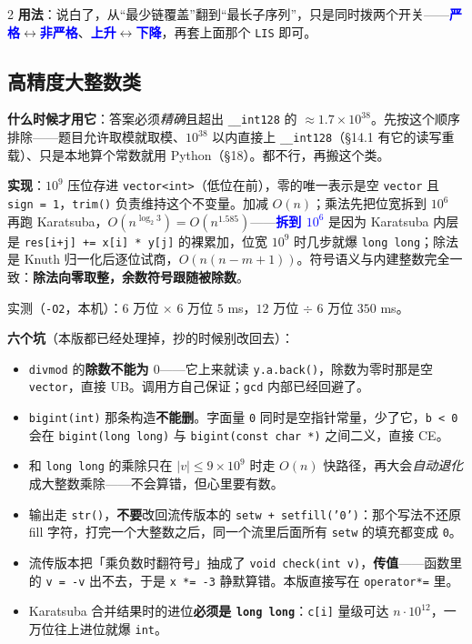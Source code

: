 \begin{multicols*}{2}
		\textbf{用法}：说白了，从``最少链覆盖''翻到``最长子序列''，只是同时拨两个开关——\textcolor{blue}{\textbf{严格}}$\leftrightarrow$\textcolor{blue}{\textbf{非严格}}、\textcolor{blue}{\textbf{上升}}$\leftrightarrow$\textcolor{blue}{\textbf{下降}}，再套上面那个 \texttt{LIS} 即可。


	\end{multicols*} %

		\subsection[\tochl{高精度大整数类}]{高精度大整数类}

		\textbf{什么时候才用它}：答案必须\emph{精确}且超出 \texttt{\_\_int128} 的 $\approx 1.7 \times 10^{38}$。先按这个顺序排除——题目允许取模就取模、$10^{38}$ 以内直接上 \texttt{\_\_int128}（§14.1 有它的读写重载）、只是本地算个常数就用 Python（§18）。都不行，再搬这个类。

		\textbf{实现}：$10^9$ 压位存进 \texttt{vector<int>}（低位在前），零的唯一表示是空 \texttt{vector} 且 \texttt{sign = 1}，\texttt{trim()} 负责维持这个不变量。加减 $O(n)$；乘法先把位宽拆到 $10^6$ 再跑 Karatsuba，$O(n^{\log_2 3}) = O(n^{1.585})$——\textcolor{blue}{\textbf{拆到 $10^6$}} 是因为 Karatsuba 内层是 \texttt{res[i+j] += x[i] * y[j]} 的裸累加，位宽 $10^9$ 时几步就爆 \texttt{long long}；除法是 Knuth 归一化后逐位试商，$O(n(n-m+1))$。符号语义与内建整数完全一致：\textbf{除法向零取整，余数符号跟随被除数}。

		实测（\texttt{-O2}，本机）：$6$ 万位 $\times$ $6$ 万位 $5$ ms，$12$ 万位 $\div$ $6$ 万位 $350$ ms。

		\textbf{六个坑}（本版都已经处理掉，抄的时候别改回去）：

		\begin{itemize}
			\item \texttt{divmod} 的\textbf{除数不能为 $0$}——它上来就读 \texttt{y.a.back()}，除数为零时那是空 \texttt{vector}，直接 UB。调用方自己保证；\texttt{gcd} 内部已经回避了。
			\item \texttt{bigint(int)} 那条构造\textbf{不能删}。字面量 \texttt{0} 同时是空指针常量，少了它，\texttt{b < 0} 会在 \texttt{bigint(long long)} 与 \texttt{bigint(const char *)} 之间二义，直接 CE。
			\item 和 \texttt{long long} 的乘除只在 $|v| \le 9 \times 10^9$ 时走 $O(n)$ 快路径，再大会\emph{自动退化}成大整数乘除——不会算错，但心里要有数。
			\item 输出走 \texttt{str()}，\textbf{不要}改回流传版本的 \texttt{setw + setfill('0')}：那个写法不还原 fill 字符，打完一个大整数之后，同一个流里后面所有 \texttt{setw} 的填充都变成 \texttt{0}。
			\item 流传版本把「乘负数时翻符号」抽成了 \texttt{void check(int v)}，\textbf{传值}——函数里的 \texttt{v = -v} 出不去，于是 \texttt{x *= -3} 静默算错。本版直接写在 \texttt{operator*=} 里。
			\item Karatsuba 合并结果时的进位\textbf{必须是 \texttt{long long}}：\texttt{c[i]} 量级可达 $n \cdot 10^{12}$，一万位往上进位就爆 \texttt{int}。
		\end{itemize}

